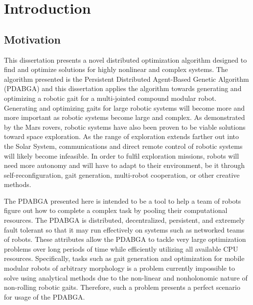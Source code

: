 

\chapter{Introduction} %
  \section{Motivation} %
    This dissertation presents a novel distributed optimization algorithm designed
      to find and optimize solutions for highly nonlinear and complex systems.
    The algorithm presented is the Persistent Distributed Agent-Based Genetic 
      Algorithm (PDABGA) and this dissertation applies the algorithm towards 
      generating and optimizing a robotic gait for a multi-jointed compound
      modular robot.        
    Generating and optimizing gaits for large robotic systems will become more
      and more important as robotic systems become large and complex. 
    As demonstrated by the Mars rovers, robotic systems have also been proven
      to be viable solutions toward space exploration.
    As the range of exploration extends farther out into the Solar System, 
      communications and direct remote control of robotic systems will likely
      become infeasible.
    In order to fulfil exploration missions, robots will need more autonomy and
      will have to adapt to their environment, be it through self-reconfiguration,
      gait generation, multi-robot cooperation, or other creative methods.

    The PDABGA presented here is intended to be a tool to help a team of robots
      figure out how to complete a complex task by pooling their computational
      resources. 
    The PDABGA is distributed, decentralized, persistent, and extremely fault
      tolerant so that it may run effectively on systems such as networked teams
      of robots. 
    These attributes allow the PDABGA to tackle very large optimization problems
      over long periods of time while efficiently utilizing all available CPU
      resources.
    Specifically, tasks such as gait generation and optimization for mobile
      modular robots of arbitrary morphology is a problem currently impossible
      to solve using analytical methods due to the non-linear and nonholonomic
      nature of non-rolling robotic gaits. 
    Therefore, such a problem presents a perfect scenario for usage of the PDABGA.

